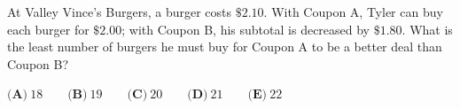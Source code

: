 At Valley Vince's Burgers, a burger costs $\$2.10$. With Coupon A, Tyler can buy each burger for $\$2.00$; with Coupon B, his subtotal is decreased by $\$1.80$. What is the least number of burgers he must buy for Coupon A to be a better deal than Coupon B?

$\textbf{(A)}\ 18\qquad\textbf{(B)}\ 19\qquad\textbf{(C)}\ 20\qquad\textbf{(D)}\ 21\qquad\textbf{(E)}\ 22$
